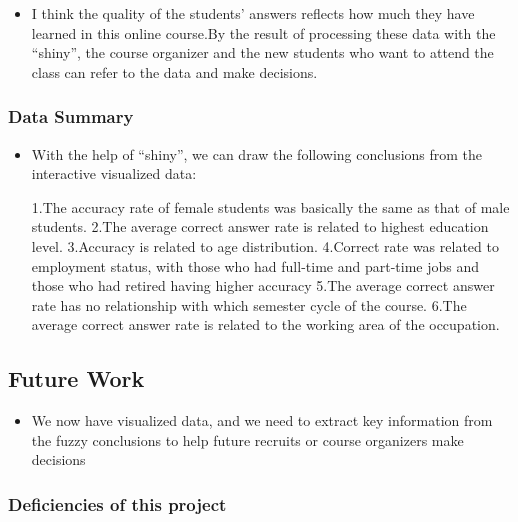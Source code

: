 \documentclass[]{article}
\providecommand{\tightlist}{%
  \setlength{\itemsep}{0pt}\setlength{\parskip}{0pt}}
\begin{document}
\begin{itemize}
\tightlist
\item
  I think the quality of the students' answers reflects how much they
  have learned in this online course.By the result of processing these
  data with the ``shiny'', the course organizer and the new students who
  want to attend the class can refer to the data and make decisions.
\end{itemize}

\hypertarget{data-summary}{%
\subsubsection{Data Summary}\label{data-summary}}

\begin{itemize}
\tightlist
\item
  With the help of ``shiny'', we can draw the following conclusions from
  the interactive visualized data:

  1.The accuracy rate of female students was basically the same as that
  of male students. 2.The average correct answer rate is related to
  highest education level. 3.Accuracy is related to age distribution.
  4.Correct rate was related to employment status, with those who had
  full-time and part-time jobs and those who had retired having higher
  accuracy 5.The average correct answer rate has no relationship with
  which semester cycle of the course. 6.The average correct answer rate
  is related to the working area of the occupation. 
\end{itemize}

\hypertarget{future-work}{%
\subsection{Future Work}\label{future-work}}

\begin{itemize}
\tightlist
\item
  We now have visualized data, and we need to extract key information
  from the fuzzy conclusions to help future recruits or course
  organizers make decisions
\end{itemize}

\hypertarget{deficiencies-of-this-project}{%
\subsubsection{Deficiencies of this
project}\label{deficiencies-of-this-project}}
\end{document}
